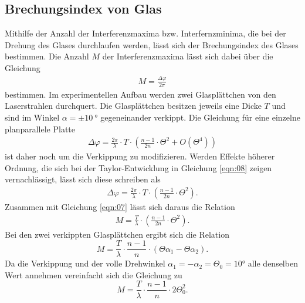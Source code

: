 \subsection{Brechungsindex von Glas}
\noindent Mithilfe der Anzahl der Interferenzmaxima bzw. Interfernzminima, die
bei der Drehung des Glases durchlaufen werden, lässt sich der Brechungsindex des
Glases bestimmen. Die Anzahl $M$ der Interferenzmaxima lässt sich dabei über die
Gleichung
\begin{align}
  M = \frac{\Delta \varphi}{2 \pi}
  \label{eqn:07}
\end{align}
\noindent bestimmen. Im experimentellen Aufbau werden zwei Glasplättchen von den
Laserstrahlen durchquert. Die Glasplättchen besitzen jeweils eine Dicke $T$ und
sind im Winkel $\alpha = \pm \SI{10}{\degree}$ gegeneinander verkippt. Die
Gleichung für eine einzelne planparallele Platte
\begin{align}
  \Delta \varphi = \frac{2 \pi}{\lambda} \cdot T \cdot \left(\frac{n-1}{2n} \cdot \Theta^2 + O(\Theta^4)  \right)
  \label{eqn:08}
\end{align}
\noindent ist daher noch um die Verkippung zu modifizieren. Werden
Effekte höherer Ordnung, die sich bei der Taylor-Entwicklung in Gleichung
\ref{eqn:08} zeigen vernachlässigt, lässt sich diese schreiben als
\begin{align}
  \Delta \varphi = \frac{2 \pi}{\lambda} \cdot T \cdot \left(\frac{n-1}{2n} \cdot \Theta^2  \right).
  \label{eqn:09}
\end{align}
\noindent Zusammen mit Gleichung \ref{eqn:07} lässt sich daraus die Relation
\begin{align}
  M = \frac{T}{\lambda} \cdot \left( \frac{n-1}{2n} \cdot \Theta^2  \right).
  \label{eqn:10}
\end{align}
Bei den zwei verkippten Glasplättchen ergibt sich die Relation
\begin{equation}
  M = \frac{T}{\lambda} \cdot \frac{n-1}{n} \cdot (\Theta \alpha_1 - \Theta \alpha_2).
\end{equation}
Da die Verkippung und der volle Drehwinkel $\alpha_1 = - \alpha_2 = \Theta_0 = 10°$ alle denselben Wert
annehmen vereinfacht sich die Gleichung zu
\begin{equation}
  M = \frac{T}{\lambda} \cdot \frac{n-1}{n} \cdot 2\Theta_0^2.
  \label{eqn:M_modifiziert}
\end{equation}
